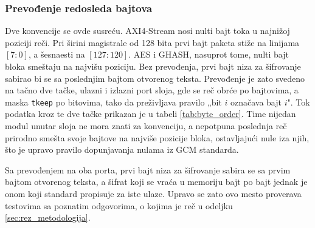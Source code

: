 \subsubsection{Prevođenje redosleda bajtova}

Dve konvencije se ovde susreću. AXI4-Stream nosi nulti bajt toka u najnižoj poziciji reči. Pri širini magistrale od 128 bita prvi bajt paketa stiže na linijama $[7{:}0]$, a šesnaesti na $[127{:}120]$. AES i GHASH, nasuprot tome, nulti bajt bloka smeštaju na najvišu poziciju. Bez prevođenja, prvi bajt niza za šifrovanje sabirao bi se sa poslednjim bajtom otvorenog teksta.
\smallbreak
Prevođenje je zato svedeno na tačno dve tačke, ulazni i izlazni port sloja, gde se reč obrće po bajtovima, a maska \texttt{tkeep} po bitovima, tako da preživljava pravilo „bit $i$ označava bajt $i$". Tok podatka kroz te dve tačke prikazan je u tabeli \ref{tab:byte_order}. Time nijedan modul unutar sloja ne mora znati za konvenciju, a nepotpuna poslednja reč prirodno smešta svoje bajtove na najviše pozicije bloka, ostavljajući nule iza njih, što je upravo pravilo dopunjavanja nulama iz GCM standarda.

\begin{table}[H]
\caption{Redosled bajtova kroz akcelerator, na primeru bloka $\mathtt{00\,11\,22\,\ldots\,ff}$}
\centering
{}
\label{tab:byte_order}
\end{table}

Sa prevođenjem na oba porta, prvi bajt niza za šifrovanje sabira se sa prvim bajtom otvorenog teksta, a šifrat koji se vraća u memoriju bajt po bajt jednak je onom koji standard propisuje za iste ulaze.
\smallbreak
Upravo se zato ovo mesto proverava testovima sa poznatim odgovorima, o kojima je reč u odeljku \ref{sec:rez_metodologija}.

